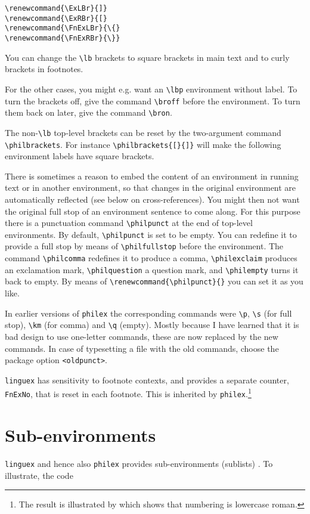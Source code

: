 \documentclass[10pt]{article}
\newcommand{\note}{\footnote}
\begin{document}
\begin{verbatim}
\renewcommand{\ExLBr}{]}
\renewcommand{\ExRBr}{[}
\renewcommand{\FnExLBr}{\{}
\renewcommand{\FnExRBr}{\}}
\end{verbatim}%
% 
You can change the \verb+\lb+ brackets to square brackets in main text and to curly brackets in footnotes.


For the other cases, you might e.g. want an \verb+\lbp+ environment without label. To turn the brackets off, give the command \verb+\broff+ before the environment. To turn them back on later, give the command \verb+\bron+.

The non-\verb+\lb+ top-level brackets can be reset by the two-argument command \verb+\philbrackets+. For instance \verb+\philbrackets{[}{]}+ will make the following environment labels have square brackets.

There is sometimes a reason  to embed the content of an environment in running text or in another environment, so that changes in the original environment are automatically reflected (see below on cross-references). You might then not want the original full stop of an environment sentence to come along. For this purpose there is a punctuation command \verb+\philpunct+ at the end of top-level environments. By default, \verb+\philpunct+ is set to be empty. You can redefine it to provide a full stop by means of \verb+\philfullstop+ before the environment. The command \verb+\philcomma+ redefines it to produce a comma, \verb+\philexclaim+ produces an exclamation mark, \verb+\philquestion+ a question mark, and \verb+\philempty+ turns it back to empty. By means of \verb+\renewcommand{\philpunct}{}+ you can set it as you like.

In earlier versions of \verb+philex+ the corresponding commands were \verb+\p+,  \verb+\s+ (for full stop), \verb+\km+ (for comma) and \verb+\q+ (empty). Mostly because I have learned that it is bad design to use one-letter commands, these are now replaced by the new commands. In case of typesetting a file with the old commands, choose the package option \verb+<oldpunct>+.

\verb+linguex+ has  sensitivity to footnote contexts, and provides a separate counter, \verb+FnExNo+, that is reset in each footnote. This is inherited by \verb+philex+.\note
	{The result is illustrated by 
		which shows that numbering is lowercase roman.}

\section{Sub-environments}
\verb+linguex+ and  hence also \verb+philex+ provides sub-environments (sublists) . To illustrate, the code
\end{document}
